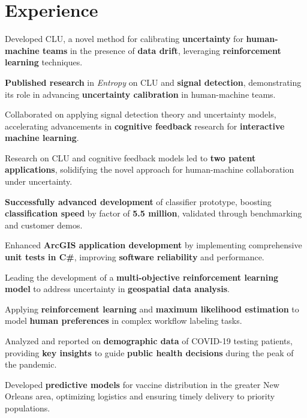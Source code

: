\documentclass[]{deedy-resume-reversed}
\begin{document}
\begin{minipage}[t]{0.60\textwidth}


\section{Experience}
\vspace{\topsep} %
\begin{tightemize}
\item Developed CLU, a novel method for calibrating \textbf{uncertainty} for \textbf{human-machine teams} in the presence of \textbf{data drift}, leveraging \textbf{reinforcement learning} techniques.
\item \textbf{Published research} in \textit{Entropy} on CLU and \textbf{signal detection}, demonstrating its role in advancing \textbf{uncertainty calibration} in human-machine teams.
\item Collaborated on applying signal detection theory and uncertainty models, accelerating advancements in \textbf{cognitive feedback} research for \textbf{interactive machine learning}.
\item Research on CLU and cognitive feedback models led to \textbf{two patent applications}, solidifying the novel approach for human-machine collaboration under uncertainty.
\item \textbf{Successfully advanced development} of classifier prototype, boosting \textbf{classification speed} by factor of \textbf{5.5 million}, validated through benchmarking and customer demos.
\item Enhanced \textbf{ArcGIS application development} by implementing comprehensive \textbf{unit tests in C\#}, improving \textbf{software reliability} and performance.
\item Leading the development of a \textbf{multi-objective reinforcement learning model} to address uncertainty in \textbf{geospatial data analysis}.
\item Applying \textbf{reinforcement learning} and \textbf{maximum likelihood estimation} to model \textbf{human preferences} in complex workflow labeling tasks.
\end{tightemize}
\sectionsep

\begin{tightemize}
	\item Analyzed and reported on \textbf{demographic data} of COVID-19 testing patients, providing \textbf{key insights} to guide \textbf{public health decisions} during the peak of the pandemic.
	\item Developed \textbf{predictive models} for vaccine distribution in the greater New Orleans area, optimizing logistics and ensuring timely delivery to priority populations.
\end{tightemize}
\sectionsep


\end{minipage}
\end{document}
